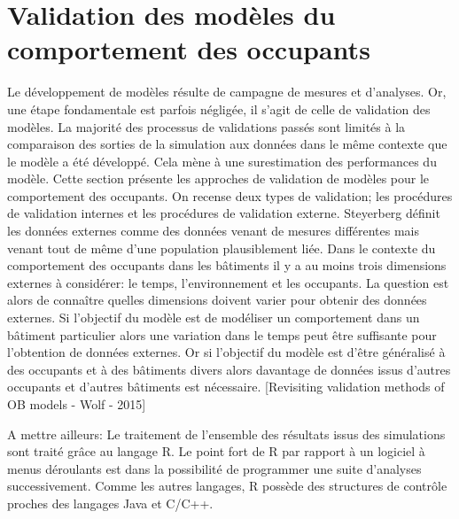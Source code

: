 \section{Validation des modèles du comportement des occupants}

Le développement de modèles résulte de campagne de mesures et d'analyses. Or, une étape fondamentale est parfois négligée, il s'agit de celle de validation des modèles. La majorité des processus de validations passés sont limités à la comparaison des sorties de la simulation aux données dans le même contexte que le modèle a été développé. Cela mène à une surestimation des performances du modèle. Cette section présente les approches de validation de modèles pour le comportement des occupants.
On recense deux types de validation; les procédures de validation internes et les procédures de validation externe. Steyerberg \cite{Steyerberg-03} définit les données externes comme des données venant de mesures différentes mais venant tout de même d'une population plausiblement liée.
Dans le contexte du comportement des occupants dans les bâtiments il y a au moins trois dimensions externes à considérer: le temps, l'environnement et les occupants. La question est alors de connaître quelles dimensions doivent varier pour obtenir des données externes. Si l'objectif du modèle est de modéliser un comportement dans un bâtiment particulier alors une variation dans le temps peut être suffisante pour l'obtention de données externes. Or si l'objectif du modèle est d'être généralisé à des occupants et à des bâtiments divers alors davantage de données issus d'autres occupants et d'autres bâtiments est nécessaire.
[Revisiting validation methods of OB models - Wolf - 2015]


A mettre ailleurs: Le traitement de l'ensemble des résultats issus des simulations sont traité grâce au langage R. Le point fort de R par rapport à un logiciel à menus déroulants est dans la possibilité de programmer une suite d'analyses successivement. Comme les autres langages, R possède des structures de contrôle proches des langages Java et C/C++.


